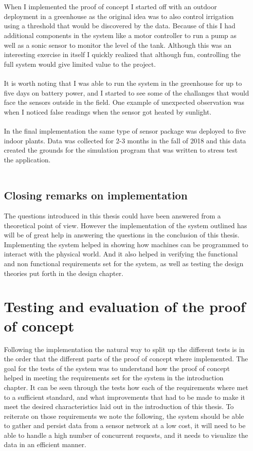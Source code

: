 \documentclass[]{uiophd}
\begin{document}
\\\\
When I implemented the proof of concept I started off with an outdoor deployment in a greenhouse as the original idea was to also control irrigation using a threshold that would be discovered by the data. Because of this I had additional components in the system like a motor controller to run a pump as well as a sonic sensor to monitor the level of the tank. Although this was an interesting exercise in itself I quickly realized that although fun, controlling the full system would give limited value to the project.
\\\\
It is worth noting that I was able to run the system in the greenhouse for up to five days on battery power, and I started to see some of the challanges that would face the sensors outside in the field. One example of unexpected observation was when I noticed false readings when the sensor got heated by sunlight. 
\\\\
In the final implementation the same type of sensor package was deployed to five indoor plants. Data was collected for 2-3 months in the fall of 2018 and this data created the grounds for the simulation program that was written to stress test the application.
\\\\
\section{Closing remarks on implementation}
The questions introduced in this thesis could have been answered from a theoretical point of view. However the implementation of the system outlined has will be of great help in answering the questions in the conclusion of this thesis. Implementing the system helped in showing how machines can be programmed to interact with the physical world. And it also helped in verifying the functional and non functional requirements set for the system, as well as testing the design theories put forth in the design chapter. 

\chapter{Testing and evaluation of the proof of concept}
Following the implementation the natural way to split up the different tests is in the order that the different parts of the proof of concept where implemented. The goal for the tests of the system was to understand how the proof of concept helped in meeting the requirements set for the system in the introduction chapter. It can be seen through the tests how each of the requirements where met to a sufficient standard, and what improvements that had to be made to make it meet the desired characteristics laid out in the introduction of this thesis. To reiterate on those requirements we note the following, the system should be able to gather and persist data from a sensor network at a low cost, it will need to be able to handle a high number of concurrent requests, and it needs to visualize the data in an efficient manner.
\end{document}
